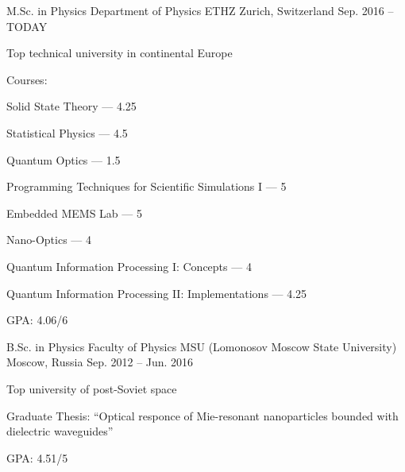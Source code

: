 \begin{cventries}
\cventry
	{M.Sc. in Physics}
	{Department of Physics ETHZ}
	{Zurich, Switzerland}
	{Sep. 2016 -- TODAY}
	{
		\begin{cvitems}
			\item {Top technical university in continental Europe}
			\item {Courses:}
			\item {Solid State Theory --- 4.25}
			\item {Statistical Physics --- 4.5}
			\item {Quantum Optics --- 1.5}
			\item {Programming Techniques for Scientific Simulations I --- 5}
			\item {Embedded MEMS Lab --- 5}
			\item {Nano-Optics --- 4}
			\item {Quantum Information Processing I: Concepts --- 4}
			\item {Quantum Information Processing II: Implementations --- 4.25}
			\item {GPA: 4.06/6}
		\end{cvitems}
	}
	
\cventry
	{B.Sc. in Physics}
	{Faculty of Physics MSU (Lomonosov Moscow State University)}
	{Moscow, Russia}
	{Sep. 2012 -- Jun. 2016}
	{
		\begin{cvitems}
			\item {Top university of post-Soviet space}
			\item {Graduate Thesis: ``Optical responce of Mie-resonant nanoparticles bounded with dielectric waveguides''}
			\item {GPA: 4.51/5}
		\end{cvitems}
	}
	
\end{cventries}
